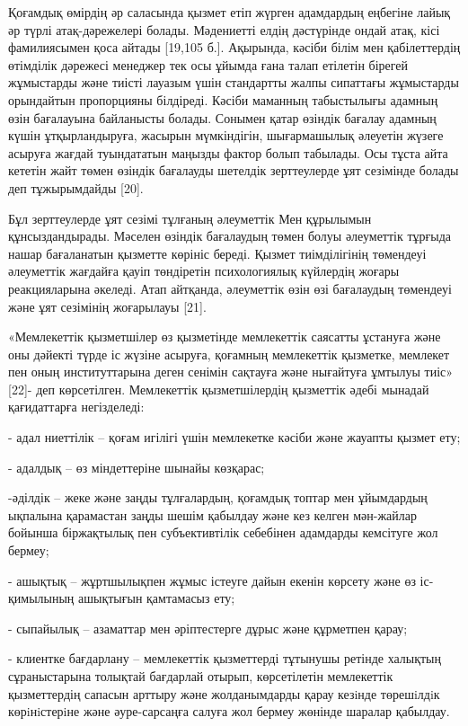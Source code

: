 \begin{multicols}{2}
Қоғамдық өмірдің әр саласында қызмет етіп жүрген адамдардың еңбегіне
лайық әр түрлі атақ-дәрежелері болады. Мәдениетті елдің дәстүрінде ондай
атақ, кісі фамилиясымен қоса айтады {[}19,105 б.{]}. Ақырында, кәсіби
білім мен қабілеттердің өтімділік дәрежесі менеджер тек осы ұйымда ғана
талап етілетін бірегей жұмыстарды және тиісті лауазым үшін стандартты
жалпы сипаттағы жұмыстарды орындайтын пропорцияны білдіреді. Кәсіби
маманның табыстылығы адамның өзін бағалауына байланысты болады. Сонымен
қатар өзіндік бағалау адамның күшін ұтқырландыруға, жасырын мүмкіндігін,
шығармашылық әлеуетін жүзеге асыруға жағдай туындататын маңызды фактор
болып табылады. Осы тұста айта кететін жайт төмен өзіндік бағалауды
шетелдік зерттеулерде ұят сезімінде болады деп тұжырымдайды {[}20{]}.

Бұл зерттеулерде ұят сезімі тұлғаның әлеуметтік Мен құрылымын
құнсыздандырады. Мәселен өзіндік бағалаудың төмен болуы әлеуметтік
тұрғыда нашар бағаланатын қызметте көрініс береді. Қызмет тиімділігінің
төмендеуі әлеуметтік жағдайға қауіп төндіретін психологиялық күйлердің
жоғары реакцияларына әкеледі. Атап айтқанда, әлеуметтік өзін өзі
бағалаудың төмендеуі және ұят сезімінің жоғарылауы {[}21{]}.

«Мемлекеттік қызметшілер өз қызметінде мемлекеттік саясатты ұстануға
және оны дәйекті түрде іс жүзіне асыруға, қоғамның мемлекеттік қызметке,
мемлекет пен оның институттарына деген сенімін сақтауға және нығайтуға
ұмтылуы тиіс» {[}22{]}- деп көрсетілген. Мемлекеттік қызметшілердің
қызметтік әдебі мынадай қағидаттарға негізделеді:

- адал ниеттілік -- қоғам игілігі үшін мемлекетке кәсіби және жауапты
қызмет ету;

- адалдық -- өз міндеттеріне шынайы көзқарас;

-әділдік -- жеке және заңды тұлғалардың, қоғамдық топтар мен ұйымдардың
ықпалына қарамастан заңды шешім қабылдау және кез келген мән-жайлар
бойынша біржақтылық пен субъективтілік себебінен адамдарды кемсітуге жол
бермеу;

- ашықтық -- жұртшылықпен жұмыс істеуге дайын екенін көрсету және өз
іс-қимылының ашықтығын қамтамасыз ету;

- сыпайылық -- азаматтар мен әріптестерге дұрыс және құрметпен қарау;

- клиентке бағдарлану -- мемлекеттік қызметтерді тұтынушы ретінде
халықтың сұраныстарына толықтай бағдарлай отырып, көрсетілетін
мемлекеттік қызметтердің сапасын арттыру және жолданымдарды қарау
кезiнде төрешiлдiк көрiнiстерiне және әуре-сарсаңға салуға жол бермеу
жөнінде шаралар қабылдау.


\end{multicols}
